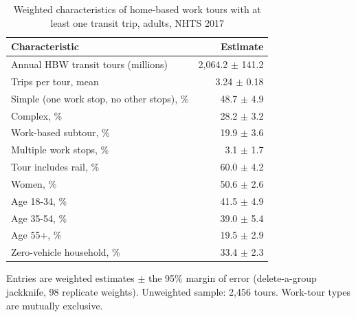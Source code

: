 \begin{table}[tbp]
\centering
\caption{Weighted characteristics of home-based work tours with at least one transit trip, adults, NHTS 2017}
\label{tab:work-tours}
\begin{tabular}{lr}
\toprule
Characteristic & Estimate \\
\midrule
Annual HBW transit tours (millions) & 2,064.2 $\pm$ 141.2 \\
Trips per tour, mean & 3.24 $\pm$ 0.18 \\
Simple (one work stop, no other stops), \% & 48.7 $\pm$ 4.9 \\
Complex, \% & 28.2 $\pm$ 3.2 \\
Work-based subtour, \% & 19.9 $\pm$ 3.6 \\
Multiple work stops, \% & 3.1 $\pm$ 1.7 \\
Tour includes rail, \% & 60.0 $\pm$ 4.2 \\
Women, \% & 50.6 $\pm$ 2.6 \\
Age 18-34, \% & 41.5 $\pm$ 4.9 \\
Age 35-54, \% & 39.0 $\pm$ 5.4 \\
Age 55+, \% & 19.5 $\pm$ 2.9 \\
Zero-vehicle household, \% & 33.4 $\pm$ 2.3 \\
\bottomrule
\end{tabular}
\par\smallskip
{\footnotesize Entries are weighted estimates $\pm$ the 95\% margin of error (delete-a-group jackknife, 98 replicate weights). Unweighted sample: 2,456 tours. Work-tour types are mutually exclusive.}
\end{table}
